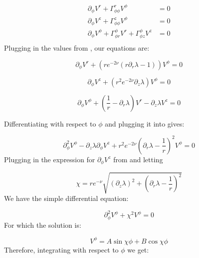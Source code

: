 \documentclass{article}
\begin{document}
\begin{equation}
\begin{aligned}
\partial_{\phi}V^{r}+\Gamma^{r}_{\phi\phi}V^{\phi}&=0\\
\partial_{\phi}V^{z}+\Gamma^{z}_{\phi\phi}V^{\phi}&=0\\
\partial_{\phi}V^{\phi}+\Gamma^{\phi}_{\phi r}V^{r}+\Gamma^{\phi}_{\phi z}V^{z}&=0\\
\end{aligned}
\end{equation}
Plugging in the values from , our equations are: 

\begin{equation}
\partial_{\phi}V^{r}+\left(re^{-2\nu}\left(r\partial_{r}\lambda-1\right)\right)V^{\phi}=0\label{eq:V-r-phi}
\end{equation}

\begin{equation}
\label{eq:V_z-V_phi}
\partial_{\phi}V^{z}+\left(r^{2}e^{-2\nu}\partial_{z}\lambda\right)V^{\phi}=0
\end{equation}

\begin{equation}
\partial_{\phi}V^{\phi}+\left(\frac{1}{r}-\partial_{r}\lambda\right)V^{r}-\partial_{z}\lambda V^{z}=0\label{eq:V-phi-r-z}
\end{equation}

Differentiating  with respect to $\phi$ and plugging it into  gives:

\begin{equation}
\partial^{2}_{\phi}V^{\phi}-\partial_z\lambda\partial_{\phi}V^z+r^{2}e^{-2\nu}\left(\partial_r\lambda-\frac{1}{r}\right)^2V^{\phi}=0
\end{equation}
Plugging in the expression for $\partial_{\phi}V^z$ from
 and letting 

\begin{equation}
\label{eq:def-chi}
\chi=re^{-\nu}\sqrt{\left(\partial_z\lambda\right)^2+\left(\partial_r\lambda-\frac{1}{r}\right)^2}
\end{equation}
We have the simple differential equation:

\begin{equation}
\partial^2_\phi V^\phi+\chi^2 V^\phi=0
\end{equation}
For which the solution is:

\begin{equation}
V^{\phi}=A\sin\chi\phi+B\cos\chi\phi
\end{equation}
Therefore, integrating  with respect to $\phi$ we get:
\end{document}
